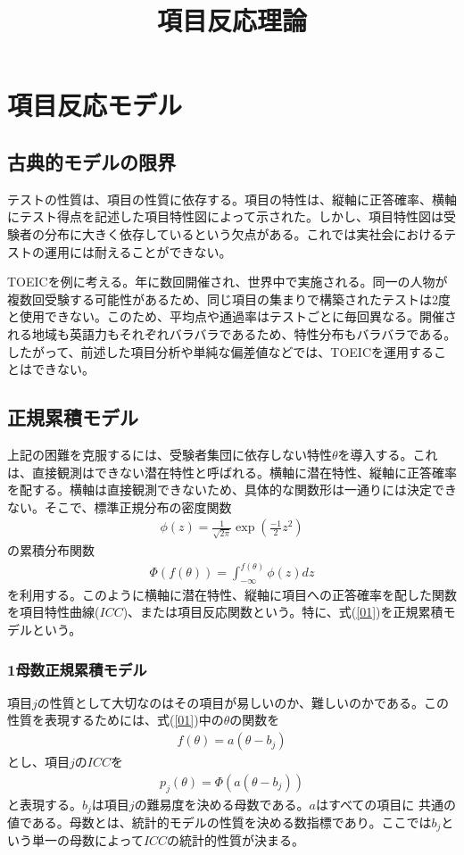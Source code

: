 \documentclass[12pt]{jarticle}
\title{項目反応理論}
\date{}
\begin{document}
\maketitle
\section{項目反応モデル}
\subsection{古典的モデルの限界}
テストの性質は、項目の性質に依存する。項目の特性は、縦軸に正答確率、横軸にテスト得点を記述した項目特性図によって示された。しかし、項目特性図は受験者の分布に大きく依存しているという欠点がある。これでは実社会におけるテストの運用には耐えることができない。

TOEICを例に考える。年に数回開催され、世界中で実施される。同一の人物が複数回受験する可能性があるため、同じ項目の集まりで構築されたテストは2度と使用できない。このため、平均点や通過率はテストごとに毎回異なる。開催される地域も英語力もそれぞれバラバラであるため、特性分布もバラバラである。したがって、前述した項目分析や単純な偏差値などでは、TOEICを運用することはできない。
\subsection{正規累積モデル}
上記の困難を克服するには、受験者集団に依存しない特性$\theta$を導入する。これは、直接観測はできない潜在特性と呼ばれる。横軸に潜在特性、縦軸に正答確率を配する。横軸は直接観測できないため、具体的な関数形は一通りには決定できない。そこで、標準正規分布の密度関数
\begin{eqnarray}
  \displaystyle \phi(z) = \frac{1}{\sqrt{2\pi}}\exp\left(\frac{-1}{2}z^2\right)
\end{eqnarray}
の累積分布関数
\begin{eqnarray}
  \label{01}
  \displaystyle \Phi(f(\theta)) = \int_{-\infty}^{f(\theta)} \phi(z)dz
\end{eqnarray}
を利用する。このように横軸に潜在特性、縦軸に項目への正答確率を配した関数を項目特性曲線($ICC$)、または項目反応関数という。特に、式(\ref{01})を正規累積モデルという。
\subsubsection{1母数正規累積モデル}
項目$j$の性質として大切なのはその項目が易しいのか、難しいのかである。この性質を表現するためには、式(\ref{01})中の$\theta$の関数を
\begin{eqnarray}
  \displaystyle f(\theta) = a(\theta - b_{j})
\end{eqnarray}
とし、項目$j$の$ICC$を
\begin{eqnarray}
  \displaystyle　p_{j}(\theta) = \Phi(a(\theta-b_{j}))
\end{eqnarray}
と表現する。$b_{j}$は項目$j$の難易度を決める母数である。$a$はすべての項目に
共通の値である。母数とは、統計的モデルの性質を決める数指標であり。ここでは$b_{j}$という単一の母数によって$ICC$の統計的性質が決まる。
\end{document}
